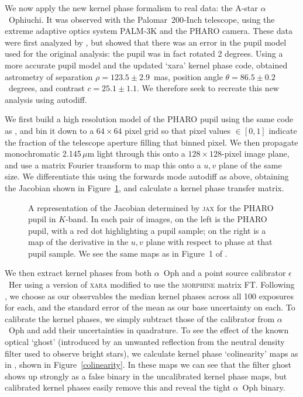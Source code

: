 \documentclass[modern]{aastex63}
\begin{document}
We now apply the new kernel phase formalism to real data: the A-star $\alpha$~Ophiuchi. It was observed with the Palomar~200-Inch telescope, using the extreme adaptive optics system PALM-3K and the PHARO camera. These data were first analyzed by \citet{palomar}, but \citet{martinache20} showed that there was an error in the pupil model used for the original analysis: the pupil was in fact rotated 2 degrees. Using a more accurate pupil model and the updated `xara' kernel phase code, \citet{martinache20} obtained astrometry of separation $\rho = 123.5 \pm 2.9$~mas, position angle $\theta = 86.5 \pm 0.2$~degrees, and contrast $c = 25.1 \pm 1.1$. We therefore seek to recreate this new analysis using autodiff.

We first build a high resolution model of the PHARO pupil using the same code as \citet{martinache20}, and bin it down to a $64\times64$ pixel grid so that pixel values $\in [0,1]$ indicate the fraction of the telescope aperture filling that binned pixel. We then propagate monochromatic 2.145\,$\mu$m light through this onto a $128\times128$-pixel image plane, and use a matrix Fourier transform to map this onto a $u,v$ plane of the same size. We differentiate this using the forwards mode autodiff as above, obtaining the Jacobian shown in Figure~\ref{pharo_jacobian}, and calculate a kernel phase transfer matrix.

\begin{figure}
\caption{A representation of the Jacobian determined by \textsc{jax} for the PHARO pupil in $K$-band. In each pair of images, on the left is the PHARO pupil, with a red dot highlighting a pupil sample; on the right is a map of the derivative in the $u,v$ plane with respect to phase at that pupil sample. We see the same maps as in Figure~1 of \citet{martinache10}. \label{pharo_jacobian}}
\end{figure}

We then extract kernel phases from both $\alpha$~Oph and a point source calibrator $\epsilon$~Her using a version of \textsc{xara} modified to use the \textsc{morphine} matrix FT. Following \citet{martinache20}, we choose as our observables the median kernel phases across all 100 exposures for each, and the standard error of the mean as our base uncertainty on each. To calibrate the kernel phases, we simply subtract those of the calibrator from $\alpha$~Oph and add their uncertainties in quadrature. To see the effect of the known optical `ghost' (introduced by an unwanted reflection from the neutral density filter used to observe bright stars), we calculate kernel phase `colinearity' maps as in \citet{martinache20}, shown in Figure~\ref{colinearity}. In these maps we can see that the filter ghost shows up strongly as a false binary in the uncalibrated kernel phase maps, but calibrated kernel phases easily remove this and reveal the tight $\alpha$~Oph binary. 
\end{document}
